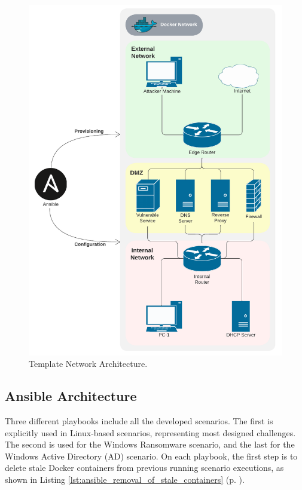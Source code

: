 \begin{figure}[H]
    \includegraphics[width=12cm]{figures/example.pdf}
    \caption{Template Network Architecture.}
    \label{fig:template_net}
\end{figure}

\subsection{Ansible Architecture} \label{sec:ansible_structure}

Three different playbooks include all the developed scenarios. The first is explicitly used in Linux-based scenarios, representing most designed challenges. The second is used for the Windows Ransomware scenario, and the last for the Windows Active Directory (AD) scenario. On each playbook, the first step is to delete stale Docker containers from previous running scenario executions, as shown in Listing \ref{lst:ansible_removal_of_stale_containers} (p. \pageref{lst:ansible_removal_of_stale_containers}).

\clearpage

